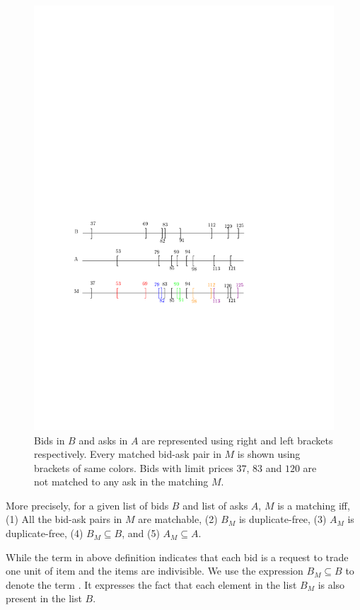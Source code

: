 \documentclass[a4paper,UKenglish,cleveref, autoref]{lipics-v2019}
\begin{document}
\begin{figure}[h!]
\centering
\includegraphics[width=.8\textwidth]{brack_matching.pdf}
\caption{ Bids in $B$ and asks in $A$ are represented using right and left brackets respectively. Every matched bid-ask pair in $M$ is shown using  brackets of same colors. Bids with limit prices $37$, $83$ and $120$ are not matched to any ask in the matching $M$.}
\label{fig:matching}
\end{figure}

More precisely, for a given list of bids $B$ and list of asks $A$, $M$ is a matching iff, (1) All the bid-ask pairs in $M$ are matchable, (2) $B_M$ is duplicate-free, (3) $A_M$ is duplicate-free, (4) $B_M \subseteq B$, and (5) $A_M \subseteq A$.

\begin{definition}
\end{definition}
While the term \emph{} in  above definition indicates that each bid is a request to trade one unit of item and the items are indivisible.  We use the expression $B_M \subseteq B$  to denote the term .  It expresses the fact that each element in the list $B_M$ is also present in the list $B$.
\end{document}
